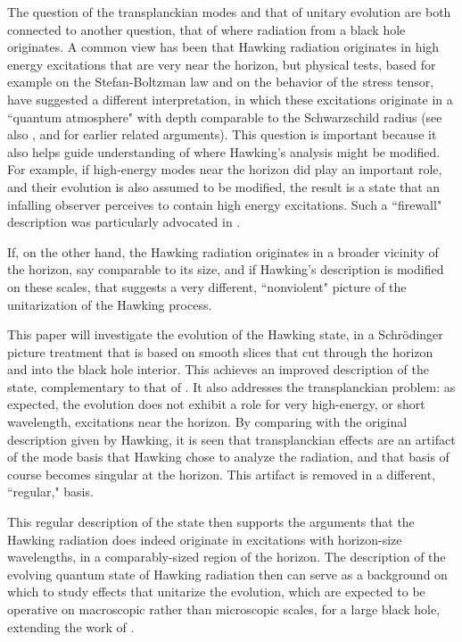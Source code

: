 The question of the transplanckian modes and that of unitary evolution are both connected to another question, that of where radiation from a black hole originates. A common view has been that Hawking radiation originates in  high energy excitations that are very near the horizon, but physical tests, based for example on the Stefan-Boltzman law and on the behavior of the stress tensor, have suggested a different interpretation, in which these excitations originate in a ``quantum atmosphere" with depth comparable to the Schwarzschild radius (see also \DLP, and  for earlier related arguments).  This question is important because it also helps guide understanding of where Hawking's analysis might be modified.  For example, if high-energy modes near the horizon did play an important role, and their evolution is also assumed to be modified, the result is a state that an infalling observer perceives to contain high energy excitations.  Such a ``firewall" description was particularly advocated in \AMPS.
 
 If, on the other hand, the Hawking radiation originates in a broader vicinity of the horizon, say comparable to its size, and if Hawking's description is modified on these scales, that suggests a very different, ``nonviolent" picture of the unitarization of the Hawking process.  
 
This paper will investigate the evolution of the Hawking state, in a Schr\"odinger picture treatment that is based on smooth slices that cut through the horizon and into the black hole interior.   This achieves an improved description of the state, complementary to that of \Hawkrad.  It also addresses the transplanckian problem: as expected, the evolution does not exhibit a role for very high-energy, or short wavelength, excitations near the horizon.  By comparing with the original description given by Hawking, it is seen that transplanckian effects are an artifact of the mode basis that Hawking chose to analyze the radiation, and that basis of course becomes singular at the horizon.  This artifact is removed in a different, ``regular," basis.  

This regular description of the state then supports the arguments that the Hawking radiation does indeed originate in excitations with horizon-size wavelengths, in a comparably-sized region of the horizon.  The description of the evolving quantum state of Hawking radiation then can serve as a background on which to study effects that unitarize the evolution, which are expected to be operative on macroscopic rather than microscopic scales, for a large black hole,
extending the work of .  


